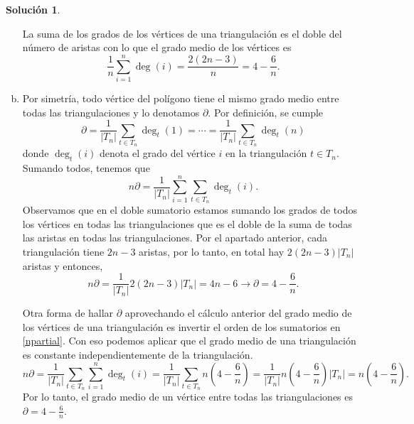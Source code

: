 \documentclass[10pt]{article}
\theoremstyle{definition}
\newtheorem*{sol}{Solución}
\begin{document}
\begin{sol}
\begin{enumerate}[(a)]
    La suma de los grados de los vértices de una triangulación es el doble del número de aristas con lo que el grado medio de los vértices es 
    \[\frac{1}{n}\sum_{i=1}^n\deg(i)=\frac{2(2n-3)}{n}=4-\frac{6}{n}.\]

\item Por simetría, todo vértice del polígono tiene el mismo grado medio entre todas las triangulaciones y lo denotamos $\partial$. Por definición, se cumple
\[\partial = \frac{1}{|T_n|}\sum_{t\in T_n}\deg_t(1)=\cdots=\frac{1}{|T_n|}\sum_{t\in T_n}\deg_t(n)\]
donde $\deg_t(i)$ denota el grado del vértice $i$ en la triangulación $t\in T_n$.
Sumando todos, tenemos que
\begin{equation}\label{npartial}
    n\partial = \frac{1}{|T_n|}\sum_{i=1}^n\sum_{t\in T_n}\deg_t(i).\tag{$\star$}
\end{equation}
Observamos que en el doble sumatorio estamos sumando los grados de todos los vértices en todas las triangulaciones que es el doble de la suma de todas las aristas en todas las triangulaciones. Por el apartado anterior, cada triangulación tiene $2n-3$ aristas, por lo tanto, en total hay $2(2n-3)|T_n|$ aristas y entonces,
\[n\partial = \frac{1}{|T_n|}2(2n-3)|T_n|=4n-6\longrightarrow \partial=4-\frac{6}{n}.\]

Otra forma de hallar $\partial$ aprovechando el cálculo anterior del grado medio de los vértices de una triangulación es invertir el orden de los sumatorios en \eqref{npartial}. Con eso podemos aplicar que el grado medio de una triangulación es constante independientemente de la triangulación.
\[n\partial = \frac{1}{|T_n|}\sum_{t\in T_n}\sum_{i=1}^n\deg_t(i)=\frac{1}{|T_n|}\sum_{t\in T_n}n\left(4-\frac{6}{n}\right)=\frac{1}{|T_n|}n\left(4-\frac{6}{n}\right)|T_n|=n\left(4-\frac{6}{n}\right).\]
Por lo tanto, el grado medio de un vértice entre todas las triangulaciones es $\partial = 4-\frac{6}{n}$.


\end{enumerate}
\end{sol}
\end{document}
